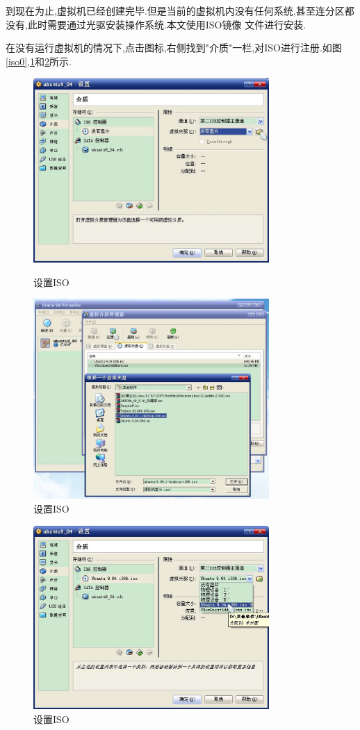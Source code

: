 \documentclass[12pt,a4paper]{article}
\begin{document}
到现在为止,虚拟机已经创建完毕.但是当前的虚拟机内没有任何系统,甚至连分区都没有,此时需要通过光驱安装操作系统.本文使用ISO镜像
文件进行安装.

在没有运行虚拟机的情况下,点击图标,右侧找到"介质"一栏,对ISO进行注册.如图\ref{iso0},\ref{iso1}和\ref{iso2}所示.
\begin{figure}[!bthp]
\centering
\includegraphics[width=0.8\textwidth,scale=0.8]{pic/f_vb_setting_iso.eps}
\caption{设置ISO\label{iso0}}
\includegraphics[width=0.8\textwidth,scale=0.8]{pic/f_vb_setting_iso_register.eps}
\caption{设置ISO\label{iso1}}
\end{figure}
\begin{figure}[!bthp]
\centering
\includegraphics[width=0.8\textwidth,scale=0.8]{pic/f_vb_setting_iso_set.eps}
\caption{设置ISO\label{iso2}}
\end{figure}
\end{document}
